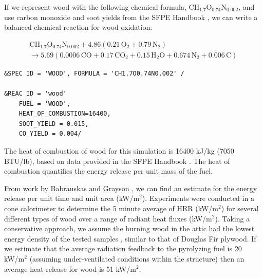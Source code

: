 \documentclass[11pt,oneside]{book}
\renewcommand{\C}{\mbox{C}}
\renewcommand{\H}{\mbox{H}}
\renewcommand{\O}{\mbox{O}}
\newcommand{\N}{\mbox{N}}
\begin{document}
If we represent wood with the following chemical formula, $\C\H_{1.7}\O_{0.74}\N_{0.002}$, and use carbon monoxide and soot yields from the SFPE Handbook \cite{SFPE:Tewarson}, we can write a balanced chemical reaction for wood oxidation:

\begin{multline}
\C\H_{1.7}\O_{0.74}\N_{0.002} + 4.86(0.21\,\O_{2} + 0.79\,\N_{2}) \\ 
\rightarrow 5.69(0.0006\,\C\O + 0.17\,\C\O_{2} + 0.15\,\H_{2}\O + 0.674\,\N_{2} + 0.006\,\C)
\label{eq:wood_comb}
\end{multline}


\begin{lstlisting}
&SPEC ID = 'WOOD', FORMULA = 'CH1.7O0.74N0.002' /

&REAC ID = 'wood' 
    FUEL = 'WOOD', 
    HEAT_OF_COMBUSTION=16400,
    SOOT_YIELD = 0.015,
    CO_YIELD = 0.004/
\end{lstlisting}


The heat of combustion of wood for this simulation is 16400 kJ/kg (7050 BTU/lb), based on data provided in the SFPE Handbook \cite{SFPE:Tewarson}. The heat of combustion quantifies the energy release per unit mass of the fuel.

From work by Babrauskas and Grayson \cite{babrauskas1990}, we can find an estimate for the energy release per unit time and unit area (kW/m$^2$). Experiments were conducted in a cone calorimeter to determine the 5 minute average of HRR (kW/m$^2$) for several different types of wood over a range of radiant heat fluxes (kW/m$^2$). Taking a conservative approach, we assume the burning wood in the attic had the lowest energy density of the tested samples \cite{babrauskas1990}, similar to that of Douglas Fir plywood. If we estimate that the average radiation feedback to the pyrolyzing fuel is 20 kW/m$^2$ (assuming under-ventilated conditions within the structure) then an average heat release for wood is 51 kW/m$^2$.
\end{document}
